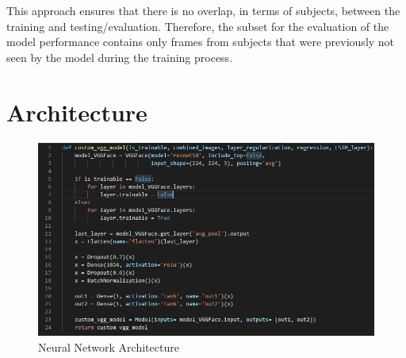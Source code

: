 This approach ensures that there is no overlap, in terms of subjects, between the training and testing/evaluation. Therefore, the subset for the evaluation of the model performance contains only frames from subjects that were previously not seen by the model during the training process.




\section{Architecture}

\begin{figure}[H]
  \begin{center}
  \includegraphics[angle=0, width=1.0\textwidth]{Figures/model_architecture.PNG}
  \caption{Neural Network Architecture}
  \label{fig:NNArchitecture}
  \end{center}
\end{figure}

